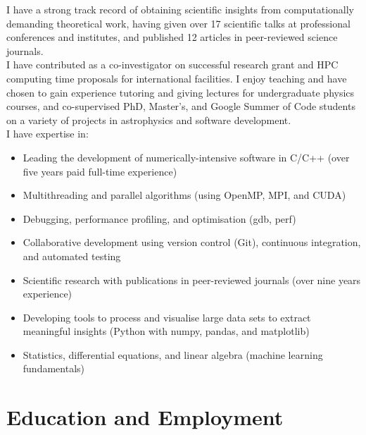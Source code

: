 \documentclass[11pt]{article} %
\begin{document}
I have a strong track record of obtaining scientific insights from computationally demanding theoretical work, having given over 17 scientific talks at professional conferences and institutes, and published 12 articles in peer-reviewed science journals.\\

I have contributed as a co-investigator on successful research grant and HPC computing time proposals for international facilities. I enjoy teaching and have chosen to gain experience tutoring and giving lectures for undergraduate physics courses, and co-supervised PhD, Master's, and Google Summer of Code students on a variety of projects in astrophysics and software development.\\
%


I have expertise in:
\begin{itemize}
  \item Leading the development of numerically-intensive software in C/C++ (over five years paid full-time experience)
  \item Multithreading and parallel algorithms (using OpenMP, MPI, and CUDA)
  \item Debugging, performance profiling, and optimisation (gdb, perf)
  \item Collaborative development using version control (Git), continuous integration, and automated testing
  \item Scientific research with publications in peer-reviewed journals (over nine years experience)
  \item Developing tools to process and visualise large data sets to extract meaningful insights (Python with numpy, pandas, and matplotlib)
  \item Statistics, differential equations, and linear algebra (machine learning fundamentals)
\end{itemize}



\section{Education and Employment}
\end{document}
